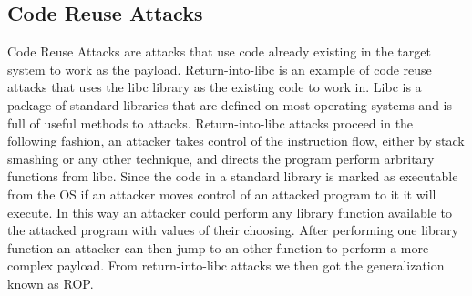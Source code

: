 \documentclass[11pt]{amsart}
\begin{document}
\subsection*{Code Reuse Attacks}
Code Reuse Attacks are attacks that use code already existing in the target system to work as the payload. Return-into-libc is an example of code reuse attacks that uses the libc library as the existing code to work in. Libc is a package of standard libraries that are defined on most operating systems and is full of useful methods to attacks. Return-into-libc attacks proceed in the following fashion, an attacker takes control of the instruction flow, either by stack smashing or any other technique, and directs the program perform arbritary functions from libc. Since the code in a standard library is marked as executable from the OS if an attacker moves control of an attacked program to it it will execute. In this way an attacker could perform any library function available to the attacked program with values of their choosing. After performing one library function an attacker can then jump to an other function to perform a more complex payload.  From return-into-libc attacks we then got the generalization known as ROP.
\end{document}
